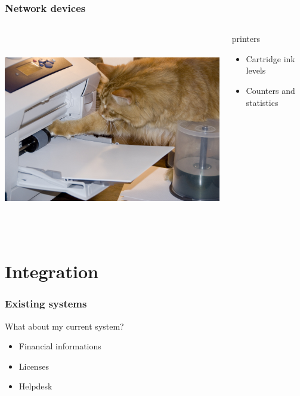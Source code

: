 \documentclass{beamer}
\begin{document}
\begin{frame}

    \frametitle{Network devices}


 \begin{columns}
 \begin{column}{0.15\textwidth}
         \includegraphics[height=8.5cm]{./pics/printer.jpg}
 \end{column}
 \begin{column}{1.25\textwidth}
    

    \begin{block}{printers}
        \begin{itemize}
            \item Cartridge ink levels
            \item Counters and statistics
        \end{itemize}
    \end{block}

 \end{column}
\end{columns}
\end{frame}



\section{Integration}

\begin{frame}

    \frametitle{Existing systems}

 
    \begin{block}{What about my current system?}
        \begin{itemize}
            \item Financial informations
            \item Licenses
            \item Helpdesk
        \end{itemize}
    \end{block}
   

\end{frame}
\end{document}
